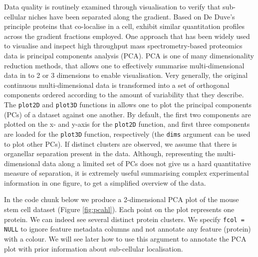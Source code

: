 Data quality is routinely examined through visualisation to verify
that sub-cellular niches have been separated along the gradient. Based
on De Duve's principle \cite{DeDuve:1981} proteins that co-localise in
a cell, exhibit similar quantitation profiles across the gradient
fractions employed. One approach that has been widely used to
visualise and inspect high throughput mass spectrometry-based
proteomics data is principal components analysis (PCA). PCA is one of
many dimensionality reduction methods, that allows one to effectively
summarise multi-dimensional data in to 2 or 3 dimensions to enable
visualisation. Very generally, the original continuous
multi-dimensional data is transformed into a set of orthogonal
components ordered according to the amount of variability that they
describe. The \texttt{plot2D} and \texttt{plot3D} functions in
 allows one to plot the principal components (PCs) of
a dataset against one another. By default, the first two components are
plotted on the x- and y-axis for the \texttt{plot2D} function, and
first three components are loaded for the \texttt{plot3D} function,
respectively (the \texttt{dims} argument can be used to plot other
PCs). If distinct clusters are observed, we assume that there is
organellar separation present in the data. Although, representing the
multi-dimensional data along a limited set of PCs does not give us a
hard quantitative measure of separation, it is extremely useful
summarising complex experimental information in one figure, to get a
simplified overview of the data.

In the code chunk below we produce a 2-dimensional PCA plot of the
mouse stem cell dataset (Figure \ref{fig:pcahl}). Each point on the
plot represents one protein. We can indeed see several distinct
protein clusters. We specify \texttt{fcol = NULL} to ignore feature
metadata columns and not annotate any feature (protein) with a
colour. We will see later how to use this argument to annotate the PCA
plot with prior information about sub-cellular localisation.

